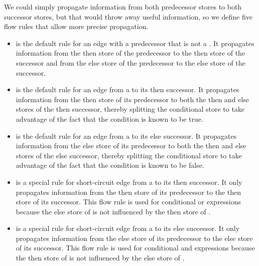 We could simply propagate information from both predecessor stores to both successor stores, but that would throw away useful information, so we define five flow rules that allow more precise propagation.
        \begin{itemize}
        \item {} is the default rule for an edge with a predecessor that
                  is not a .  It propagates information from the then store
                  of the predecessor to the then store of the successor and from the else store of
                  the predecessor to the else store of the successor.
        \item {} is the default rule for an edge from a 
                  to its then successor.  It propagates information from the then store of its predecessor
                  to both the then and else stores of the then successor, thereby splitting the conditional
                  store to take advantage of the fact that the condition is known to be true.
        \item {} is the default rule for an edge from a 
                  to its else successor.  It propagates information from the else store of its predecessor
                  to both the then and else stores of the else successor, thereby splitting the conditional
                  store to take advantage of the fact that the condition is known to be false.
        \item {} is a special rule for short-circuit edge from a
                   to its then successor.  It only propagates information from
                  the then store of its predecessor to the then store of its successor.  This flow rule
                  is used for conditional or expressions because the else store of  is
                  not influenced by the then store of .
        \item {} is a special rule for short-circuit edge from a
                   to its else successor.  It only propagates information from
                  the else store of its predecessor to the else store of its successor.  This flow rule
                  is used for conditional and expressions because the then store of  is
                  not influenced by the else store of .
        \end{itemize}
        
